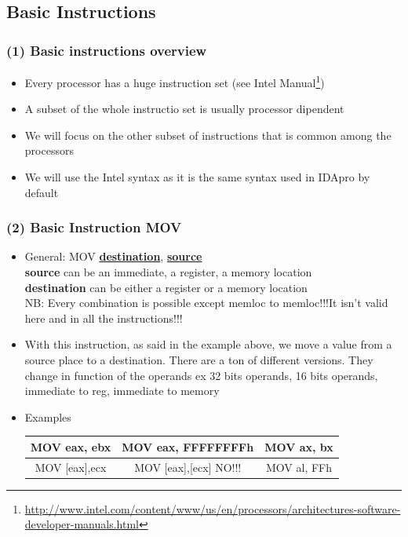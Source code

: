 \documentclass[]{beamer}
\begin{document}
	\subsection{Basic Instructions}
		\begin{frame}
			\frametitle{(1) Basic instructions overview}
				\begin{itemize}
					\item{Every processor has a huge instruction set (see Intel Manual\footnote{\url{http://www.intel.com/content/www/us/en/processors/architectures-software-developer-manuals.html}})}
					\item{A subset of the whole instructio set is usually processor dipendent}
					\item{We will focus on the other subset of instructions that is common among the processors}
					\item{We will use the Intel syntax as it is the same syntax used in IDApro by default}
				\end{itemize}
		\end{frame}
		\begin{frame}
			\frametitle{(2) Basic Instruction MOV}
				\begin{itemize}	
					\item{ General: MOV \underline{\textbf{destination}}, \underline{\textbf{source}}}\\
					\textbf{source} can be an immediate, a register, a memory location\\
					\textbf{destination} can be either a register  or a memory location\\
					NB: Every combination is possible except memloc to memloc!!!It isn't valid here and in all the instructions!!!

					\item{With this instruction, as said in the example above, we move a value from a source place to a destination. There are a ton of different versions. They change in function of the operands ex 32 bits operands, 16 bits operands, immediate to reg, immediate to memory }
				\item{Examples}
					\begin{table}[h]
						\begin{tabular}{|c|c|c|}
							\hline
							MOV eax, ebx&MOV eax, FFFFFFFFh &MOV ax, bx\\    \hline
							MOV [eax],ecx&MOV [eax],[ecx] \color{red}NO!!!&MOV al, FFh\\
							\hline
						\end{tabular}
					\end{table}
			\end{itemize}	

		\end{frame}
\end{document}
